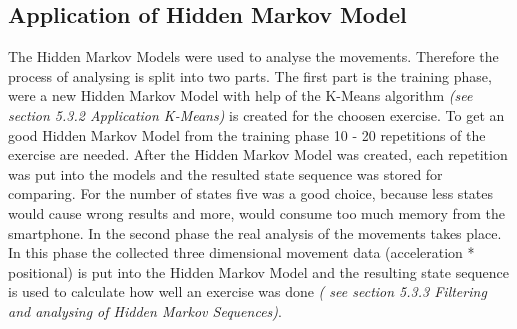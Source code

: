 \subsection{Application of Hidden Markov Model}

The Hidden Markov Models were used to analyse the movements. Therefore the process of analysing is split into two parts. The first part is the training phase, were a new Hidden Markov Model with help of the K-Means algorithm \textit{\small(see section 5.3.2 Application K-Means)} is created for the choosen exercise. To get an good Hidden Markov Model from the training phase 10 - 20 repetitions of the exercise are needed. After the Hidden Markov Model was created, each repetition was put into the models and the resulted state sequence was stored for comparing. For the number of states five was a good choice, because less states would cause wrong results and more, would consume too much memory from the smartphone. In the second phase the real analysis of the movements takes place. In this phase the collected three dimensional movement data (acceleration * positional) is put into the Hidden Markov Model and the resulting state sequence is used to calculate how well an exercise was done \textit{\small(  see section 5.3.3 Filtering and analysing of Hidden Markov Sequences)}.

